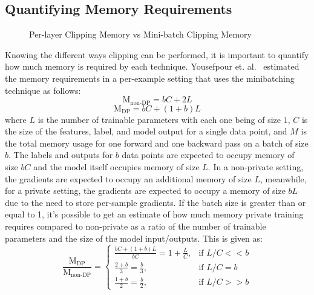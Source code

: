 \subsection{Quantifying Memory Requirements}
\begin{figure}[h]
\centering
    \qquad
   
   \caption{Per-layer Clipping Memory vs Mini-batch Clipping Memory}\label{FigDiff}
   \label{ClippingMemory}
\end{figure} 
Knowing the different ways clipping can be performed, it is important to quantify how much memory is required by each technique. Yousefpour et. al.~\cite{RefWorks:RefID:51-yousefpouropacus:} estimated the memory requirements in a per-example setting that uses the minibatching technique as follows:
\[ \text{M}_\text{non-DP}=bC+2L\]   
\[ \text{M}_\text{DP}=bC+(1+b)L\]
where $L$ is the number of trainable parameters with each one being of size $1$, $C$ is the size of the features, label, and model output for a single data point, and $M$ is the total memory usage for one forward and one backward pass on a batch of size $b$. The labels and outputs for $b$ data points are expected to occupy memory of size $bC$ and the model itself occupies memory of size $L$. In a non-private setting, the gradients are expected to occupy an additional memory of size $L$, meanwhile, for a private setting, the gradients are expected to occupy a memory of size $bL$ due to the need to store per-sample gradients. If the batch size is greater than or equal to 1, it's possible to get an estimate of how much memory private training requires compared to non-private as a ratio of the number of trainable parameters and the size of the model input/outputs. This is given as:
\[
\frac{\text{M}_\text{DP}}{\text{M}_\text{non-DP}} = \begin{cases} 
\frac{bC+(1+b)L}{bC}=1+\frac{L}{C}, & \text{if } L/C<<b \\
\frac{2+b}{3}=\frac{b}{3}, & \text{if } L/C=b \\
\frac{1+b}{2}=\frac{b}{2}, & \text{if } L/C>>b 
\end{cases}
\]


